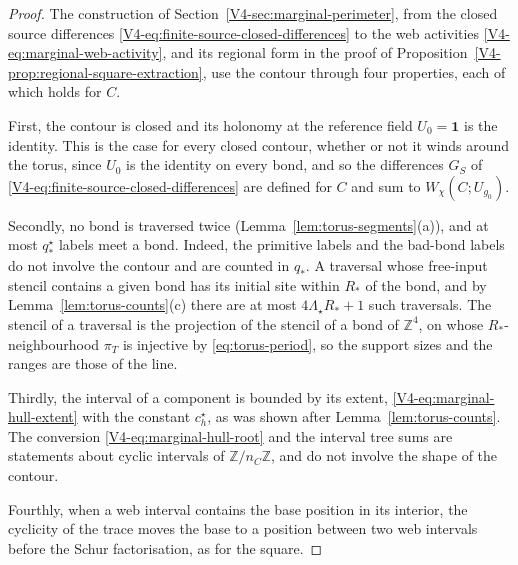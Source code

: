 \documentclass[11pt]{article}
\newcommand{\id}{\mathbf 1}
\numberwithin{equation}{section}
\theoremstyle{remark}
\theoremstyle{plain}
\begin{document}
\begin{proof}
The construction of Section~\ref{V4-sec:marginal-perimeter}, from the closed source differences \eqref{V4-eq:finite-source-closed-differences} to the web activities \eqref{V4-eq:marginal-web-activity}, and its regional form in the proof of Proposition~\ref{V4-prop:regional-square-extraction}, use the contour through four properties, each of which holds for $C$.

First, the contour is closed and its holonomy at the reference field $U_0=\id$ is the identity. This is the case for every closed contour, whether or not it winds around the torus, since $U_0$ is the identity on every bond, and so the differences $G_S$ of \eqref{V4-eq:finite-source-closed-differences} are defined for $C$ and sum to $W_{\chi}(C;U_{g_0})$.

Secondly, no bond is traversed twice (Lemma~\ref{lem:torus-segments}(a)), and at most $q_*^{\star}$ labels meet a bond. Indeed, the primitive labels and the bad-bond labels do not involve the contour and are counted in $q_*$. A traversal whose free-input stencil contains a given bond has its initial site within $R_*$ of the bond, and by Lemma~\ref{lem:torus-counts}(c) there are at most $4\Lambda_{\star}R_*+1$ such traversals. The stencil of a traversal is the projection of the stencil of a bond of $\mathbb Z^4$, on whose $R_*$-neighbourhood $\pi_T$ is injective by \eqref{eq:torus-period}, so the support sizes and the ranges are those of the line.

Thirdly, the interval of a component is bounded by its extent, \eqref{V4-eq:marginal-hull-extent} with the constant $c_h^{\star}$, as was shown after Lemma~\ref{lem:torus-counts}. The conversion \eqref{V4-eq:marginal-hull-root} and the interval tree sums are statements about cyclic intervals of $\mathbb Z/n_C\mathbb Z$, and do not involve the shape of the contour.

Fourthly, when a web interval contains the base position in its interior, the cyclicity of the trace moves the base to a position between two web intervals before the Schur factorisation, as for the square.


\end{proof}
\end{document}
